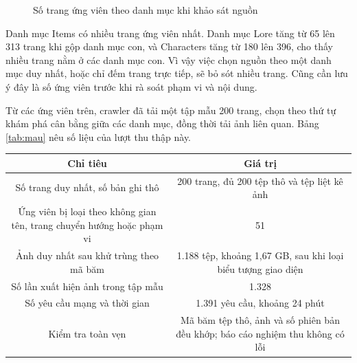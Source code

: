 \begin{figure}[H]\centering
{}
\caption{Số trang ứng viên theo danh mục khi khảo sát nguồn}\label{fig:danhmuc}
\end{figure}


Danh mục Items có nhiều trang ứng viên nhất. Danh mục Lore tăng từ 65 lên 313 trang khi gộp danh mục con, và Characters tăng từ 180 lên 396, cho thấy nhiều trang nằm ở các danh mục con. Vì vậy việc chọn nguồn theo một danh mục duy nhất, hoặc chỉ đếm trang trực tiếp, sẽ bỏ sót nhiều trang. Cũng cần lưu ý đây là số ứng viên trước khi rà soát phạm vi và nội dung.


Từ các ứng viên trên, crawler đã tải một tập mẫu 200 trang, chọn theo thứ tự khám phá cân bằng giữa các danh mục, đồng thời tải ảnh liên quan. Bảng \ref{tab:mau} nêu số liệu của lượt thu thập này.


\begin{longtable*}{|C{0.45}|C{0.55}|}
\hline \textbf{Chỉ tiêu} & \textbf{Giá trị} \\ \hline
Số trang duy nhất, số bản ghi thô & 200 trang, đủ 200 tệp thô và tệp liệt kê ảnh \\ \hline
Ứng viên bị loại theo không gian tên, trang chuyển hướng hoặc phạm vi & 51 \\ \hline
Ảnh duy nhất sau khử trùng theo mã băm & 1.188 tệp, khoảng 1,67 GB, sau khi loại biểu tượng giao diện \\ \hline
Số lần xuất hiện ảnh trong tập mẫu & 1.328 \\ \hline
Số yêu cầu mạng và thời gian & 1.391 yêu cầu, khoảng 24 phút \\ \hline
Kiểm tra toàn vẹn & Mã băm tệp thô, ảnh và số phiên bản đều khớp; báo cáo nghiệm thu không có lỗi \\ \hline
\end{longtable*}
\tabend


